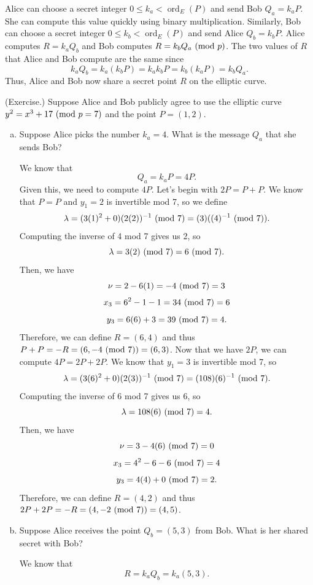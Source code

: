 \documentclass[letterpaper]{article}
\DeclareMathOperator{\ord}{ord}
\begin{document}
\bigskip 

Alice can choose a secret integer $0 \leq k_a < \ord_{E}(P)$ and send Bob $Q_a = k_a P$. She can compute this value quickly using binary multiplication. Similarly, Bob can choose a secret integer $0 \leq k_b < \ord_{E}(P)$ and send Alice $Q_b = k_b P$. Alice computes $R = k_a Q_b$ and Bob computes $R = k_b Q_a \ (\mathrm{mod}\ p)$. The two values of $R$ that Alice and Bob compute are the same since \[k_a Q_b = k_a (k_b P) = k_a k_b P = k_b (k_a P) = k_b Q_a.\]
Thus, Alice and Bob now share a secret point $R$ on the elliptic curve. 

\begin{mdframed}
    (Exercise.) Suppose Alice and Bob publicly agree to use the elliptic curve $y^2 = x^3 + 17 \ (\mathrm{mod}\ p = 7)$ and the point $P = (1, 2)$. 
    \begin{enumerate}[(a)]
        \item Suppose Alice picks the number $k_a = 4$. What is the message $Q_a$ that she sends Bob? 
        \begin{mdframed}
            We know that \[Q_a = k_a P = 4P.\] Given this, we need to compute $4P$. Let's begin with $2P = P + P$. We know that $P = P$ and $y_1 = 2$ is invertible mod 7, so we define 
            \[\lambda = (3(1)^2 + 0)(2(2))^{-1} \ (\mathrm{mod}\ 7) = (3)((4)^{-1} \ (\mathrm{mod}\ 7)).\]
            Computing the inverse of 4 mod 7 gives us 2, so 
            \[\lambda = 3(2) \ (\mathrm{mod}\ 7) = 6 \ (\mathrm{mod}\ 7).\]
            Then, we have 
            \[\nu = 2 - 6(1) = -4 \ (\mathrm{mod}\ 7) = 3\]
            \[x_3 = 6^2 - 1 - 1 = 34 \ (\mathrm{mod}\ 7) = 6\]
            \[y_3 = 6(6) + 3 = 39 \ (\mathrm{mod}\ 7) = 4.\]
            Therefore, we can define $R = (6, 4)$ and thus $P + P = -R = (6, -4 \ (\mathrm{mod}\ 7)) = (6, 3)$. Now that we have $2P$, we can compute $4P = 2P + 2P$. We know that $y_1 = 3$ is invertible mod 7, so 
            \[\lambda = (3(6)^2 + 0)(2(3))^{-1} \ (\mathrm{mod}\ 7) = (108)(6)^{-1} \ (\mathrm{mod}\ 7).\]
            Computing the inverse of 6 mod 7 gives us 6, so 
            \[\lambda = 108(6) \ (\mathrm{mod}\ 7) = 4.\]
            Then, we have 
            \[\nu = 3 - 4(6) \ (\mathrm{mod}\ 7) = 0\]
            \[x_3 = 4^2 - 6 - 6 \ (\mathrm{mod}\ 7) = 4\]
            \[y_3 = 4(4) + 0 \ (\mathrm{mod}\ 7) = 2.\]
            Therefore, we can define $R = (4, 2)$ and thus $2P + 2P = -R = (4, -2 \ (\mathrm{mod}\ 7)) = (4, 5)$.
        \end{mdframed}
        \item Suppose Alice receives the point $Q_b = (5, 3)$ from Bob. What is her shared secret with Bob?
        \begin{mdframed}
            We know that 
            \[R = k_a Q_b = k_a (5, 3).\] 
        \end{mdframed}
    \end{enumerate}
\end{mdframed}
\end{document}
